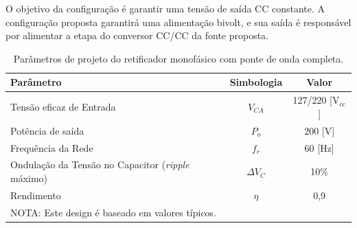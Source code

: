 
O objetivo da configuração é garantir uma tensão de saída CC constante. A configuração proposta garantirá uma alimentação bivolt, e sua saída é responsável por alimentar a etapa do conversor CC/CC da fonte proposta.

\begin{table}[H]
    \centering
    \footnotesize
    \caption{Parâmetros de projeto do retificador monofásico com ponte de onda completa.}
    \label{retificador}
    \begin{adjustbox}{max width = \textwidth}
        \begin{tabular}{|l|c|c|}
            \hline
            \rowcolor[HTML]{A8DADC}
            \textbf{Parâmetro} & \textbf{Simbologia} & \textbf{Valor}  \\ \hline
            Tensão eficaz de Entrada & $V_{CA}$ & 127/220 [V$_\text{cc}$]
            \\ \hline
              Potência de saída & $P_{o}$	 & 200 [V]
             \\ \hline
              Frequência da Rede & $f_{r}$	 & 60 [Hz]
             \\ \hline
               Ondulação da Tensão no Capacitor (\textit{ripple} máximo) & $\Delta V_{C}$ & 10\%
             \\ \hline
                Rendimento & $\eta$ & 0,9
             \\ \hline
              \multicolumn{3}{l}{NOTA: Este design é baseado em valores típicos.} \\ 
        \end{tabular}
    \end{adjustbox}
\end{table}

